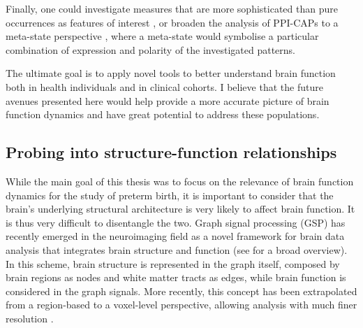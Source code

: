 Finally, one could investigate measures that are more sophisticated than pure occurrences as features of interest \citep{Chen2015, Bolton2020}, or broaden the analysis of PPI-CAPs to a meta-state perspective \citep{Miller2016,Vidaurre2017}, where a meta-state would symbolise a particular combination of expression and polarity of the investigated patterns.

The ultimate goal is to apply novel tools to better understand brain function both in health individuals and in clinical cohorts. I believe that the future avenues presented here would help provide a more accurate picture of brain function dynamics and have great potential to address these populations.


\subsection*{Probing into structure-function relationships}
While the main goal of this thesis was to focus on the relevance of brain function dynamics for the study of preterm birth, it is important to consider that the brain's underlying structural architecture is very likely to affect brain function. It is thus very difficult to disentangle the two. Graph signal processing (GSP) has recently emerged in the neuroimaging field as a novel framework for brain data analysis that integrates brain structure and function (see \citet{Huang2018} for a broad overview). In this scheme, brain structure is represented in the graph itself, composed by brain regions as nodes and white matter tracts as edges, while brain function is considered in the graph signals. More recently, this concept has been extrapolated from a region-based to a voxel-level perspective, allowing analysis with much finer resolution \citep{Tarun2020}.

